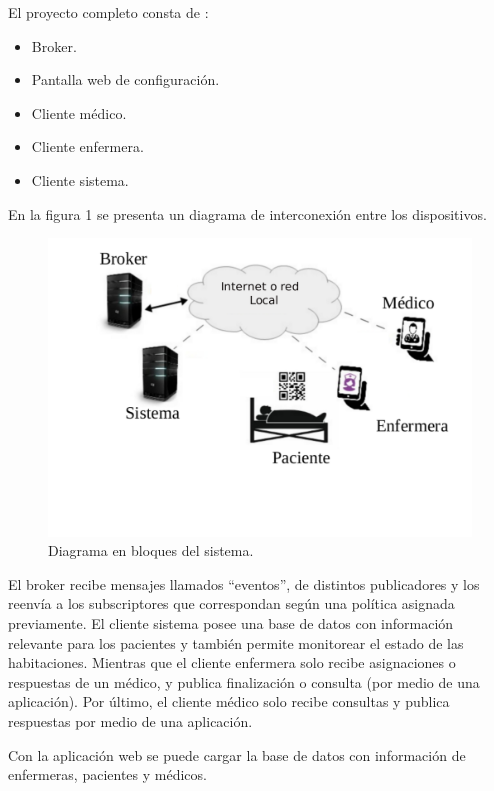 \documentclass[
11pt, %
]{charter}
\begin{document}
\vspace{50px}

El proyecto completo consta de :
\begin{itemize}
\item Broker.
\item Pantalla web de configuración.
\item Cliente médico.
\item Cliente enfermera.
\item Cliente sistema.
\end{itemize}
En la figura 1 se presenta un diagrama de interconexión entre los dispositivos.



\begin{figure}[htpb]
\centering 
\includegraphics[width=.7\textwidth]{./Figuras/diag3.pdf}
\caption{ Diagrama en bloques del sistema.}
\label{fig:diagBloques}
\end{figure}


El broker recibe mensajes llamados ``eventos'', de distintos publicadores y los reenvía a los subscriptores que correspondan según una política asignada previamente. El cliente sistema posee una base de datos con información relevante para los pacientes y también permite monitorear el estado de las habitaciones. Mientras que el cliente enfermera solo recibe asignaciones o respuestas de un médico, y publica finalización o consulta (por medio de una aplicación). Por último, el cliente médico solo recibe consultas y publica respuestas por medio de una aplicación.

Con la aplicación web se puede cargar la base de datos con información de enfermeras, pacientes y médicos.
\vfill

 
\end{document}
